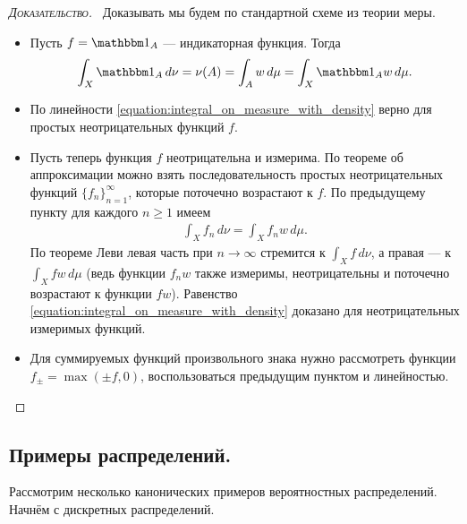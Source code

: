 \documentclass[../main.tex]{subfiles}
\begin{document}
\begin{proof}[\normalfont\textsc{Доказательство}]\
 Доказывать мы будем по стандартной схеме из теории меры.
 \begin{itemize}
  \item Пусть $ f = \Ind_A $ --- индикаторная функция. Тогда
   \begin{align*}
    \int_{X} \Ind_A \, d\nu = \nu(A) = \int_{A} w\,d\mu = \int_{X} \Ind_A w\,d\mu.    
   \end{align*} 
  \item По линейности \eqref{equation:integral_on_measure_with_density} верно для простых неотрицательных функций $ f $.
  \item Пусть теперь функция $ f $ неотрицательна и измерима. По теореме об аппроксимации можно взять последовательность простых неотрицательных функций $\{f_{n}\}_{n=1}^{\infty} $, которые поточечно возрастают к $ f $. По предыдущему пункту для каждого $ n \geqslant 1 $ имеем
   \begin{align*}
    \int_{X} f_n \,d\nu = \int_{X} f_n w \, d\mu.  
   \end{align*} По теореме Леви левая часть при $ n \to \infty $ стремится к $ \int_{X} f\,d\nu  $, а правая --- к $ \int_{X} fw\,d\mu $ (ведь функции $ f_n w $ также измеримы, неотрицательны и поточечно возрастают к функции $ fw $). Равенство \eqref{equation:integral_on_measure_with_density} доказано для неотрицательных измеримых функций.

  \item Для суммируемых функций произвольного знака нужно рассмотреть функции $ f_\pm = \max(\pm f, 0) $, воспользоваться предыдущим пунктом и линейностью.
 \end{itemize}
\end{proof}

\subsection{Примеры распределений.}

Рассмотрим несколько канонических примеров вероятностных распределений. Начнём с дискретных распределений.
\end{document}
